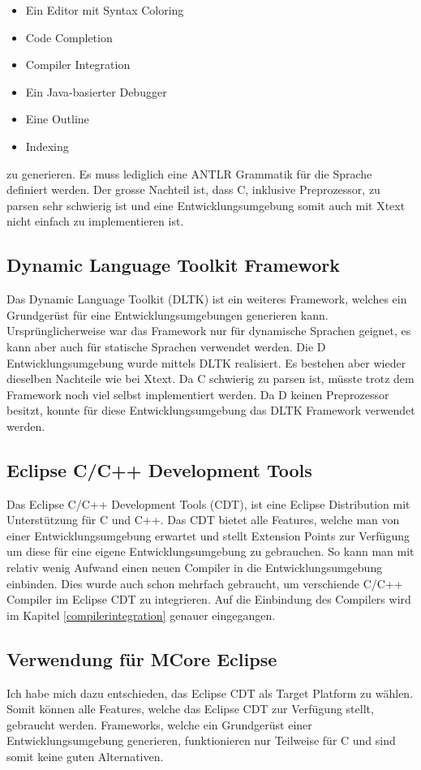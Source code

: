 \begin{itemize} 
	\item Ein Editor mit Syntax Coloring
	\item Code Completion
	\item Compiler Integration
	\item Ein Java-basierter Debugger
	\item Eine Outline
	\item Indexing
\end{itemize}

zu generieren. \cite{xtext} Es muss lediglich eine ANTLR\cite{antlr} Grammatik für die Sprache definiert werden. Der grosse Nachteil ist, dass C, inklusive Preprozessor, zu parsen sehr schwierig ist und eine Entwicklungsumgebung somit auch mit Xtext nicht einfach zu implementieren ist.

\subsection{Dynamic Language Toolkit Framework}
Das Dynamic Language Toolkit (DLTK) ist ein weiteres Framework, welches ein Grundgerüst für eine Entwicklungsumgebungen generieren kann. Ursprünglicherweise war das Framework nur für dynamische Sprachen geignet, es kann aber auch für statische Sprachen verwendet werden. Die D Entwicklungsumgebung wurde mittels DLTK realisiert\cite{ddt}. Es bestehen aber wieder dieselben Nachteile wie bei Xtext. Da C schwierig zu parsen ist, müsste trotz dem Framework noch viel selbst implementiert werden. Da D keinen Preprozessor besitzt, konnte für diese Entwicklungsumgebung das DLTK Framework verwendet werden.

\subsection{Eclipse C/C++ Development Tools}
Das Eclipse C/C++ Development Tools (CDT), ist eine Eclipse Distribution mit Unterstützung für C und C++. Das CDT bietet alle Features, welche man von einer Entwicklungsumgebung erwartet und stellt Extension Points zur Verfügung um diese für eine eigene Entwicklungsumgebung zu gebrauchen. So kann man mit relativ wenig Aufwand einen neuen Compiler in die Entwicklungsumgebung einbinden. Dies wurde auch schon mehrfach gebraucht, um verschiende C/C++ Compiler im Eclipse CDT zu integrieren. Auf die Einbindung des Compilers wird im Kapitel \ref{compilerintegration} genauer eingegangen.

\subsection{Verwendung für MCore Eclipse}
Ich habe mich dazu entschieden, das Eclipse CDT als Target Platform zu wählen. Somit können alle Features, welche das Eclipse CDT zur Verfügung stellt, gebraucht werden. Frameworks, welche ein Grundgerüst einer Entwicklungsumgebung generieren, funktionieren nur Teilweise für C und sind somit keine guten Alternativen.

